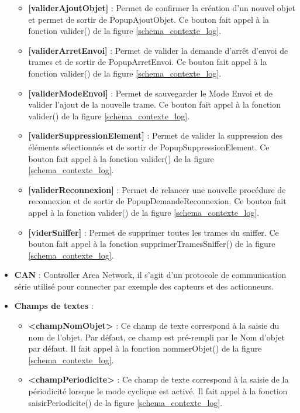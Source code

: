 \begin{itemize}
\begin{itemize}
            \item \textbf{[validerAjoutObjet]} : Permet de confirmer la création d'un nouvel objet et permet de sortir de PopupAjoutObjet. Ce bouton fait appel à la fonction valider() de la figure \ref{schema_contexte_log}.
            \item \textbf{[validerArretEnvoi]} : Permet de valider la demande d'arrêt d'envoi de trames et de sortir de PopupArretEnvoi. Ce bouton fait appel à la fonction valider() de la figure \ref{schema_contexte_log}.
            \item \textbf{[validerModeEnvoi]} : Permet de sauvegarder le Mode Envoi et de valider l'ajout de la nouvelle trame. Ce bouton fait appel à la fonction valider() de la figure \ref{schema_contexte_log}.
            \item \textbf{[validerSuppressionElement]} : Permet de valider la suppression des éléments sélectionnés et de sortir de PopupSuppressionElement. Ce bouton fait appel à la fonction valider() de la figure \ref{schema_contexte_log}.
            \item \textbf{[validerReconnexion]} : Permet de relancer une nouvelle procédure de reconnexion et de sortir de PopupDemandeReconnexion. Ce bouton fait appel à la fonction valider() de la figure \ref{schema_contexte_log}.
            \item \textbf{[viderSniffer]} : Permet de supprimer toutes les trames du sniffer. Ce bouton fait appel à la fonction supprimerTramesSniffer() de la figure \ref{schema_contexte_log}.\newline
        \end{itemize}
    \item \textbf{CAN} : Controller Area Network, il s'agit d'un protocole de communication série utilisé pour connecter par exemple des capteurs et des actionneurs.\newline
    \item \textbf{Champs de textes} :
        \begin{itemize}
            \item \textbf{<champNomObjet>} : Ce champ de texte correspond à la saisie du nom de l'objet. Par défaut, ce champ est pré-rempli par le Nom d'objet par défaut. Il fait appel à la fonction nommerObjet() de la figure \ref{schema_contexte_log}.
            \item \textbf{<champPeriodicite>} : Ce champ de texte correspond à la saisie de la périodicité lorsque le mode cyclique est activé. Il fait appel à la fonction saisirPeriodicite() de la figure \ref{schema_contexte_log}. 

\end{itemize}
\end{itemize}
